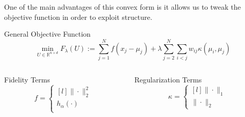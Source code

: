 \documentclass[12pt]{beamer}
\begin{document}
		
		



\begin{frame}
	One of the main advantages of this convex form is it allows us to tweak the objective function in order to exploit structure.
	\begin{block}{General Objective Function}
			$$\min_{U \in \mathbb{R}^{n \times d}} F_\lambda(U) :=   \sum_{j=1}^N f(x_j - \mu_j) + \lambda \sum_{j=2}^N \sum_{i<j} w_{ij} \kappa(\mu_i,\mu_j)$$
	\end{block}
	
	\begin{columns}[T]
		\begin{column}{0.45\linewidth}
			\begin{block}{Fidelity Terms} \vspace{-2.5ex}
				\[ f = \left\{ \begin{matrix*}[l] 
				\| \cdot \|_2^2 \\[1ex] h_{\alpha}( \cdot ) \\[1ex] 
				\end{matrix*} \right. \]
			\end{block}
		\end{column}
		\begin{column}{0.45\linewidth}
			\begin{block}{Regularization Terms}
				\[ \kappa = \left\{ \begin{matrix*}[l]
				\| \cdot\|_1 \\[1ex] \|\cdot\|_2
				\end{matrix*} \right. \]
			\end{block}
		\end{column}
	\end{columns}
\end{frame}
\end{document}
